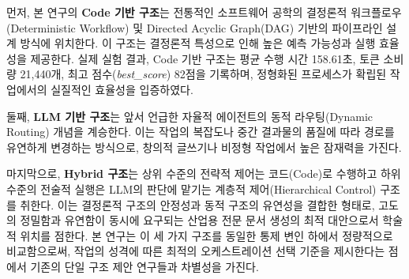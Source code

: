 먼저, 본 연구의 \textbf{Code 기반 구조}는 전통적인 소프트웨어 공학의 결정론적 워크플로우(Deterministic Workflow) 및 Directed Acyclic Graph(DAG) 기반의 파이프라인 설계 방식에 위치한다. 이 구조는 결정론적 특성으로 인해 높은 예측 가능성과 실행 효율성을 제공한다. 실제 실험 결과, Code 기반 구조는 평균 수행 시간 158.61초, 토큰 소비량 21,440개, 최고 점수(\textit{best\_score}) 82점을 기록하며, 정형화된 프로세스가 확립된 작업에서의 실질적인 효율성을 입증하였다.

둘째, \textbf{LLM 기반 구조}는 앞서 언급한 자율적 에이전트의 동적 라우팅(Dynamic Routing) 개념을 계승한다. 이는 작업의 복잡도나 중간 결과물의 품질에 따라 경로를 유연하게 변경하는 방식으로, 창의적 글쓰기나 비정형 작업에서 높은 잠재력을 가진다.

마지막으로, \textbf{Hybrid 구조}는 상위 수준의 전략적 제어는 코드(Code)로 수행하고 하위 수준의 전술적 실행은 LLM의 판단에 맡기는 계층적 제어(Hierarchical Control) 구조를 취한다. 이는 결정론적 구조의 안정성과 동적 구조의 유연성을 결합한 형태로, 고도의 정밀함과 유연함이 동시에 요구되는 산업용 전문 문서 생성의 최적 대안으로서 학술적 위치를 점한다. 본 연구는 이 세 가지 구조를 동일한 통제 변인 하에서 정량적으로 비교함으로써, 작업의 성격에 따른 최적의 오케스트레이션 선택 기준을 제시한다는 점에서 기존의 단일 구조 제안 연구들과 차별성을 가진다.